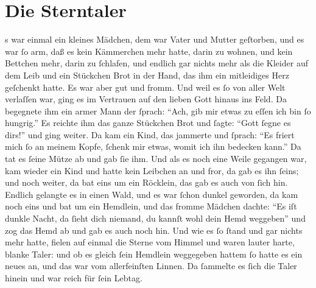\section*{Die Sterntaler}
s war einmal ein kleines Mädchen, dem war Vater und Mutter
geſtorben, und es war ſo arm, daß es kein Kämmerchen mehr
hatte, darin zu wohnen, und kein Bettchen mehr, darin zu ſchlafen,
und endlich gar nichts mehr als die Kleider auf dem Leib und ein
Stückchen Brot in der Hand, das ihm ein mitleidiges Herz geſchenkt
hatte. Es war aber gut und fromm. Und weil es ſo von aller Welt
verlaſſen war, ging es im Vertrauen auf den lieben Gott hinaus ins
Feld. Da begegnete ihm ein armer Mann der ſprach: \enquote{Ach,
gib mir etwas zu eſſen ich bin ſo hungrig.} Es reichte ihm das ganze
Stückchen Brot und ſagte: \enquote{Gott ſegne es dirs!} und ging
weiter. Da kam ein Kind, das jammerte und ſprach: \enquote{Es friert
mich ſo an meinem Kopfe, ſchenk mir etwas, womit ich ihn bedecken
kann.} Da tat es ſeine Mütze ab und gab ſie ihm. Und als es noch
eine Weile gegangen war, kam wieder ein Kind und hatte kein Leibchen
an und fror, da gab es ihn ſeins; und noch weiter, da bat eins um
ein Röcklein, das gab es auch von ſich hin. Endlich gelangte es in
einen Wald, und es war ſchon dunkel geworden, da kam noch eins und
bat um ein Hemdlein, und das fromme Mädchen dachte: \enquote{Es iſt
dunkle Nacht, da ſieht dich niemand, du kannſt wohl dein Hemd
weggeben} und zog das Hemd ab und gab es auch noch hin. Und wie es
ſo ſtand und gar nichts mehr hatte, fielen auf einmal die Sterne vom
Himmel und waren lauter harte, blanke Taler: und ob es gleich ſein
Hemdlein weggegeben hattem ſo hatte es ein neues an, und das war vom
allerfeinſten Linnen. Da ſammelte es ſich die Taler hinein und war
reich für ſein Lebtag.
